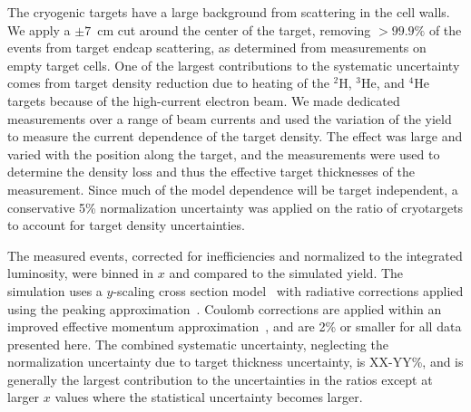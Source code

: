 \documentclass[aps,prl,superscriptaddress,showpacs,twocolumn,floatfix,amsmath,amssymb]{revtex4-1}
\begin{document}

The cryogenic targets have a large background from scattering in the cell walls. We apply a $\pm 7$~cm
cut around the center of the target, removing $>99.9\%$ of the events from target endcap
scattering, as determined from measurements on empty target cells. One of the largest contributions to the
systematic uncertainty comes from target density reduction due to heating of the $^2$H, $^3$He, and $^4$He
targets because of the high-current electron beam. We made dedicated measurements over a range of
beam currents and used the variation of the yield to measure the current dependence of the target density.
The effect was large and varied with the position along the target, and the measurements were used to
determine the density loss and thus the effective target thicknesses of the measurement. Since much 
of the model dependence will be target independent, a conservative 5\% normalization uncertainty was applied
on the ratio of cryotargets to account for target density uncertainties.


The measured events, corrected for inefficiencies and normalized to the integrated luminosity, were binned
in $x$ and compared to the simulated yield. The simulation uses a $y$-scaling cross section
model~\cite{day_arns, arrington99} with radiative corrections applied using the peaking
approximation~\cite{zye_thesis, stein75}. Coulomb corrections are applied within an improved effective
momentum approximation~\cite{aste05}, and are 2\% or smaller for all data presented here.  The combined 
systematic uncertainty, neglecting the normalization uncertainty due to target thickness uncertainty,
is XX-YY\%, and is generally the largest contribution to the uncertainties in the ratios except at larger
$x$ values where the statistical uncertainty becomes larger.

\end{document}
